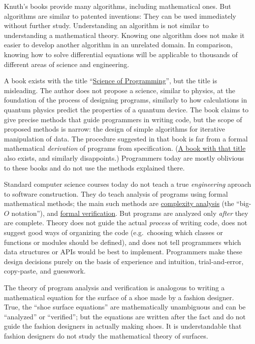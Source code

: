 Knuth's books provide many algorithms, including mathematical ones.
But algorithms are similar to patented inventions: They can be used
immediately without further study. Understanding an algorithm is not
similar to understanding a mathematical theory. Knowing one algorithm
does not make it easier to develop another algorithm in an unrelated
domain. In comparison, knowing how to solve differential equations
will be applicable to thousands of different areas of science and
engineering.

A book exists with the title ``\href{https://www.amazon.com/Science-Programming-Monographs-Computer/dp/0387964800}{Science of Programming}'',
but the title is misleading. The author does not propose a science,
similar to physics, at the foundation of the process of designing
programs, similarly to how calculations in quantum physics predict
the properties of a quantum device. The book claims to give precise
methods that guide programmers in writing code, but the scope of proposed
methods is narrow: the design of simple algorithms for iterative manipulation
of data. The procedure suggested in that book is far from a formal
mathematical \emph{derivation} of programs from specification. (\href{https://www.amazon.com/Program-Derivation-Development-Specifications-International/dp/0201416247}{A book with that title}
also exists, and similarly disappoints.) Programmers today are mostly
oblivious to these books and do not use the methods explained there.

Standard computer science courses today do not teach a true \emph{engineering}
aproach to software construction. They do teach analysis of programs
using formal mathematical methods; the main such methods are \href{https://www.cs.cmu.edu/~adamchik/15-121/lectures/Algorithmic\%20Complexity/complexity.html}{complexity analysis}
(the ``big-$O$ notation''), and \href{https://en.wikipedia.org/wiki/Formal_verification}{formal verification}.
But programs are analyzed only \emph{after} they are complete. Theory
does not guide the actual \emph{process} of writing code, does not
suggest good ways of organizing the code (e.g.~choosing which classes
or functions or modules should be defined), and does not tell programmers
which data structures or APIs would be best to implement. Programmers
make these design decisions purely on the basis of experience and
intuition, trial-and-error, copy-paste, and guesswork. 

The theory of program analysis and verification is analogous to writing
a mathematical equation for the surface of a shoe made by a fashion
designer. True, the ``shoe surface equations'' are mathematically
unambiguous and can be ``analyzed'' or ``verified''; but the equations
are written after the fact and do not guide the fashion designers
in actually making shoes. It is understandable that fashion designers
do not study the mathematical theory of surfaces.


